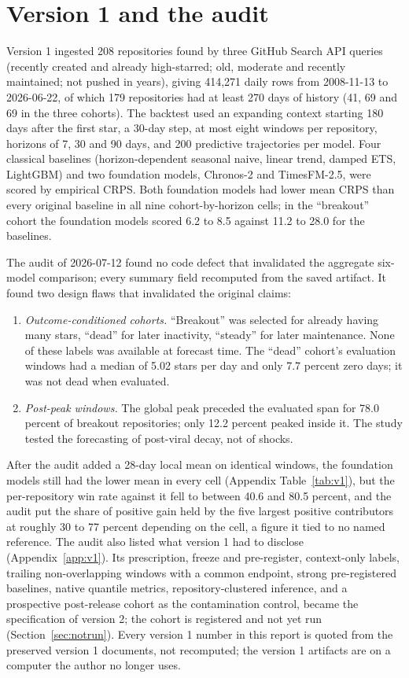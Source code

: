 \section{Version 1 and the audit}

Version 1 ingested 208 repositories found by three GitHub Search API queries (recently created and already
high-starred; old, moderate and recently maintained; not pushed in years), giving 414,271 daily rows from
2008-11-13 to 2026-06-22, of which 179 repositories had at least 270 days of history (41, 69 and 69 in the
three cohorts). The backtest used an expanding context starting 180 days after the first star, a 30-day step,
at most eight windows per repository, horizons of 7, 30 and 90 days, and 200 predictive trajectories per
model. Four classical baselines (horizon-dependent seasonal naive, linear trend, damped ETS, LightGBM) and two
foundation models, Chronos-2 and TimesFM-2.5, were scored by empirical CRPS. Both foundation models had lower
mean CRPS than every original baseline in all nine cohort-by-horizon cells; in the ``breakout'' cohort the
foundation models scored 6.2 to 8.5 against 11.2 to 28.0 for the baselines.

The audit of 2026-07-12 found no code defect that invalidated the aggregate six-model comparison; every
summary field recomputed from the saved artifact. It found two design flaws that invalidated the original
claims:
\begin{enumerate}
\item \emph{Outcome-conditioned cohorts.} ``Breakout'' was selected for already having many stars, ``dead''
  for later inactivity, ``steady'' for later maintenance. None of these labels was available at forecast
  time. The ``dead'' cohort's evaluation windows had a median of 5.02 stars per day and only 7.7 percent zero
  days; it was not dead when evaluated.
\item \emph{Post-peak windows.} The global peak preceded the evaluated span for 78.0 percent of breakout
  repositories; only 12.2 percent peaked inside it. The study tested the forecasting of post-viral decay, not
  of shocks.
\end{enumerate}
After the audit added a 28-day local mean on identical windows, the foundation models still had the lower
mean in every cell (Appendix Table~\ref{tab:v1}), but the per-repository win rate against it fell to between
40.6 and 80.5 percent, and the audit put the share of positive gain held by the five largest positive
contributors at roughly 30 to 77 percent depending on the cell, a figure it tied to no named reference. The
audit also listed what version 1 had to disclose (Appendix~\ref{app:v1}). Its prescription, freeze and
pre-register, context-only labels, trailing non-overlapping windows with a common endpoint, strong
pre-registered baselines, native quantile metrics, repository-clustered inference, and a prospective
post-release cohort as the contamination control, became the specification of version 2; the cohort is
registered and not yet run (Section~\ref{sec:notrun}). Every version 1 number in this report is quoted from
the preserved version 1 documents, not recomputed; the version 1 artifacts are on a computer the author no
longer uses.
